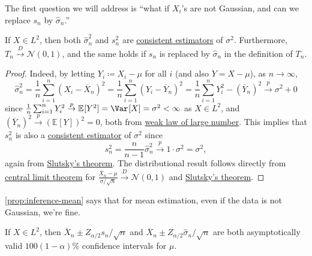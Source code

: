 The first question we will address is ``what if \(X_i\)'s are not Gaussian, and can we replace \(s_n\) by \(\hat{\sigma} _n\).''

\begin{proposition}\label{prop:inference-mean}
	If \(X \in L^2\), then both \(\hat{\sigma} _n^2\) and \(s_n^2\) are \hyperref[def:consistent]{consistent estimators} of \(\sigma ^2\). Furthermore, \(T_n \overset{D}{\to} \mathcal{N} (0, 1)\), and the same holds if \(s_n\) is replaced by \(\hat{\sigma} _n\) in the definition of \(T_n\).
\end{proposition}
\begin{proof}
	Indeed, by letting \(Y_i \coloneqq X_i - \mu \) for all \(i\) (and also \(Y = X - \mu \)), as \(n \to \infty \),
	\[
		\hat{\sigma} _n^2
		= \frac{1}{n} \sum_{i=1}^{n} \left( X_i - \overline{X} _n\right) ^2
		= \frac{1}{n} \sum_{i=1}^{n} \left( Y_i - \overline{Y} _n\right) ^2
		= \frac{1}{n} \sum_{i=1}^{n} Y_i^2 - (\overline{Y} _n)^2
		\overset{p}{\to} \sigma ^2 + 0
	\]
	since \(\frac{1}{n} \sum_{i=1}^{n} Y_i^2 \overset{p}{\to } \mathbb{E}_{}[Y^2] = \Var_{}[X] = \sigma ^2 < \infty \) as \(X \in L^2\), and \((\overline{Y} _n)^2 \overset{p}{\to } (\mathbb{E}_{}[Y])^2 = 0\), both from \hyperref[thm:WLLN]{weak law of large number}. This implies that \(s_n^2\) is also a \hyperref[def:consistent]{consistent estimator} of \(\sigma ^2\) since
	\[
		s_n^2 = \frac{n}{n-1} \hat{\sigma} _n^2 \overset{p}{\to} 1 \cdot \sigma ^2 = \sigma ^2,
	\]
	again from \hyperref[col:Slutsky]{Slutsky's theorem}. The distributional result follows directly from \hyperref[thm:CLT]{central limit theorem} for \(\frac{\overline{X} _n - \mu }{\sigma / \sqrt{n} } \overset{D}{\to} \mathcal{N} (0, 1)\) and \hyperref[col:Slutsky]{Slutsky's theorem}.
\end{proof}

\autoref{prop:inference-mean} says that for mean estimation, even if the data is not Gaussian, we're fine.

\begin{corollary}\label{col:inference-mean-CI}
	If \(X \in L^2\), then \(\overline{X} _n \pm Z_{\alpha / 2} s_n / \sqrt{n} \) and \(\overline{X} _n \pm Z_{\alpha / 2} \hat{\sigma} _n / \sqrt{n} \) are both asymptotically valid \(100 (1 - \alpha )\%\) confidence intervals for \(\mu \).
\end{corollary}

